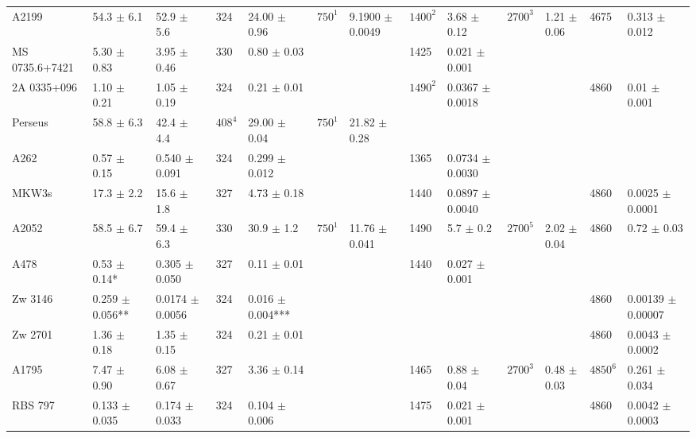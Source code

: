 \documentclass{aa}  %
\begin{document}
\begin{center}
\begin{table*}
{\begin{tabular}{l|l|l|ll|ll|ll|ll|ll}
A2199 & 54.3   $\pm$       6.1 & 52.9   $\pm$       5.6 & 324   & 24.00 $\pm$ 0.96 & $750^{1}$ & 9.1900 $\pm$ 0.0049 & $1400^2$ & 3.68 $\pm$ 0.12 & $2700^3$ & 1.21 $\pm$ 0.06 & 4675  & 0.313 $\pm$ 0.012 \\
MS 0735.6+7421 & 5.30    $\pm$       0.83 & 3.95   $\pm$       0.46 & 330   & 0.80 $\pm$ 0.03 &       &       & 1425  & 0.021 $\pm$ 0.001 &       &       &       &  \\
2A 0335+096      & 1.10     $\pm$       0.21 & 1.05   $\pm$       0.19 & 324   & 0.21 $\pm$ 0.01 &       &       & $1490^2$ & 0.0367 $\pm$ 0.0018 &       &       & 4860  & 0.01 $\pm$ 0.001 \\
Perseus & 58.8    $\pm$       6.3 & 42.4   $\pm$       4.4 & $408^4$ & 29.00 $\pm$ 0.04 & $750^{1}$ & 21.82 $\pm$ 0.28 &       &       &       &       &       &  \\
A262     & 0.57    $\pm$      0.15 & 0.540   $\pm$       0.091 & 324   & 0.299 $\pm$ 0.012 &       &       & 1365  & 0.0734 $\pm$ 0.0030 &       &       &       &  \\
MKW3s & 17.3    $\pm$       2.2 & 15.6   $\pm$       1.8 & 327   & 4.73 $\pm$ 0.18 &       &       & 1440  & 0.0897 $\pm$ 0.0040 &       &       & 4860  & 0.0025 $\pm$ 0.0001 \\
A2052 & 58.5     $\pm$      6.7 & 59.4   $\pm$       6.3 & 330   & 30.9 $\pm$ 1.2 & $750^{1}$ & 11.76 $\pm$ 0.041 & 1490  & 5.7 $\pm$ 0.2 & $2700^{5}$ & 2.02 $\pm$ 0.04 & 4860  & 0.72 $\pm$ 0.03 \\
A478     & 0.53   $\pm$       0.14* & 0.305   $\pm$       0.050 & 327   & 0.11 $\pm$ 0.01 &       &       & 1440  & 0.027 $\pm$ 0.001 &       &       &       &  \\
Zw 3146 & 0.259   $\pm$      0.056** & 0.0174   $\pm$       0.0056 & 324   & 0.016 $\pm$ 0.004*** &       &       &       &       &       &       & 4860  & 0.00139 $\pm$ 0.00007 \\
Zw 2701 & 1.36    $\pm$       0.18 & 1.35   $\pm$       0.15 & 324   & 0.21 $\pm$ 0.01 &       &       &       &       &       &       & 4860  & 0.0043 $\pm$ 0.0002 \\
A1795 & 7.47    $\pm$       0.90 & 6.08   $\pm$       0.67 & 327   & 3.36 $\pm$ 0.14 &       &       & 1465  & 0.88 $\pm$ 0.04 & $2700^3$ & 0.48 $\pm$ 0.03 & $4850^6$ & 0.261 $\pm$ 0.034 \\
RBS 797 & 0.133   $\pm$       0.035 & 0.174   $\pm$       0.033 & 324   & 0.104 $\pm$ 0.006 &       &       & 1475  & 0.021 $\pm$ 0.001 &       &       & 4860  & 0.0042 $\pm$ 0.0003 \\

\end{tabular}}
\end{table*}
\end{center}
\end{document}
